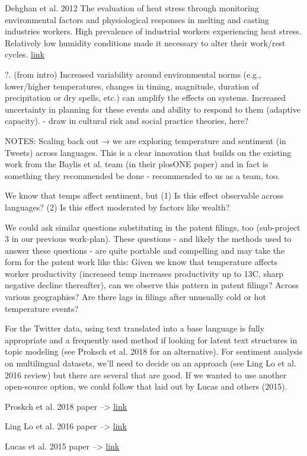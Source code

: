 \documentclass{article}
\begin{document}
Dehghan et al. 2012  The evaluation of heat stress through monitoring environmental factors and physiological responses in melting and casting industries workers. High prevalence of industrial workers experiencing heat stress. Relatively low humidity conditions made it necessary to alter their work/rest cycles. \href{http://www.ijehe.org/article.asp?issn=2277-9183;year=2012;volume=1;issue=1;spage=21;epage=21;aulast=Dehghan}{link}

?. (from intro) Increased variability around environmental norms (e.g., lower/higher temperatures, changes in timing, magnitude, duration of precipitation or dry spells, etc.) can amplify the effects on systems. Increased uncertainty in planning for these events and ability to respond to them (adaptive capacity). - draw in cultural risk and social practice theories, here?

NOTES: Scaling back out → we are exploring temperature and sentiment (in Tweets) across languages. This is a clear innovation that builds on the existing work from the Baylis et al. team (in their plosONE paper) and in fact is something they recommended be done - recommended to us as a team, too.

We know that temps affect sentiment, but (1) Is this effect observable across languages? (2) Is this effect moderated by factors like wealth?

We could ask similar questions substituting in the patent filings, too (sub-project 3 in our previous work-plan). These questions - and likely the methods used to answer these questions - are quite portable and compelling and may take the form for the patent work like this: Given we know that temperature affects worker productivity (increased temp increases productivity up to 13C, sharp negative decline thereafter), can we observe this pattern in patent filings? Across various geographies? Are there lags in filings after unusually cold or hot temperature events?

For the Twitter data, using text translated into a base language is fully appropriate and a frequently used method if looking for latent text structures in topic modeling (see Proksch et al. 2018 for an alternative). For sentiment analysis on multilingual datasets, we'll need to decide on an approach (see Ling Lo et al. 2016 review) but there are several that are good. If we wanted to use another open-source option, we could follow that laid out by Lucas and others (2015).

Proskch et al. 2018 paper --> \href{https://onlinelibrary.wiley.com/doi/full/10.1111/lsq.12218}{link} 

Ling Lo et al. 2016 paper --> \href{https://link.springer.com/article/10.1007/s10462-016-9508-4}{link} 

Lucas et al. 2015 paper --> \href{https://www.cambridge.org/core/journals/political-analysis/article/computerassisted-text-analysis-for-comparative-politics/CC8B2CF63A8CC36FE00A13F9839F92BB}{link}
 
\end{document}
